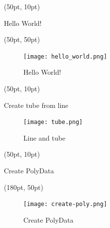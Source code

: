 \documentclass[aspectratio=169,12pt]{beamer}
\begin{document}
\begin{frame}[fragile]
\begin{textblock*}{350pt}(50pt, 10pt)
\begin{block}{Hello World!}
\end{block}
\end{textblock*}
\begin{textblock*}{350pt}(50pt, 50pt)
\begin{block}{}
\begin{figure}
\texttt{[image: hello\_world.png]}
\caption{Hello World!\label{HelloWorldFigure}}
\end{figure}
\end{block}
\end{textblock*}
\end{frame}

\begin{frame}[fragile]
\begin{textblock*}{350pt}(50pt, 10pt)
\begin{block}{Create tube from line}

\begin{figure}
\texttt{[image: tube.png]}
\caption{Line and tube\label{LineTubeFigure}}
\end{figure}
\end{block}
\end{textblock*}
\end{frame}

\begin{frame}[fragile]
\begin{textblock*}{200pt}(50pt, 10pt)
\begin{block}{Create PolyData}

\end{block}
\end{textblock*}
\begin{textblock*}{350pt}(180pt, 50pt)
\begin{figure}
\texttt{[image: create-poly.png]}
\caption{Create PolyData \label{CreatePolyData}}
\end{figure}
\end{textblock*}
\end{frame}
\end{document}
